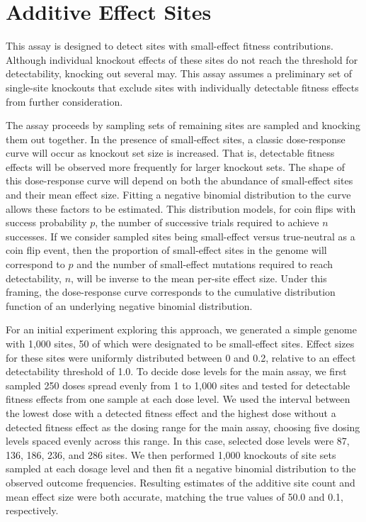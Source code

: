 \section{Additive Effect Sites}

This assay is designed to detect sites with small-effect fitness contributions.
Although individual knockout effects of these sites do not reach the threshold for detectability, knocking out several may.
This assay assumes a preliminary set of single-site knockouts that exclude sites with individually detectable fitness effects from further consideration.

The assay proceeds by sampling sets of remaining sites are sampled and knocking them out together.
In the presence of small-effect sites, a classic dose-response curve will occur as knockout set size is increased.
That is, detectable fitness effects will be observed more frequently for larger knockout sets.
The shape of this dose-response curve will depend on both the abundance of small-effect sites and their mean effect size.
Fitting a negative binomial distribution to the curve allows these factors to be estimated.
This distribution models, for coin flips with success probability $p$, the number of successive trials required to achieve $n$ successes.
If we consider sampled sites being small-effect versus true-neutral as a coin flip event, then the proportion of small-effect sites in the genome will correspond to $p$ and the number of small-effect mutations required to reach detectability, $n$, will be inverse to the mean per-site effect size.
Under this framing, the dose-response curve corresponds to the cumulative distribution function of an underlying negative binomial distribution.

For an initial experiment exploring this approach, we generated a simple genome with 1,000 sites, 50 of which were designated to be small-effect sites.
Effect sizes for these sites were uniformly distributed between 0 and 0.2, relative to an effect detectability threshold of 1.0.
To decide dose levels for the main assay, we first sampled 250 doses spread evenly from 1 to 1,000 sites and tested for detectable fitness effects from one sample at each dose level.
We used the interval between the lowest dose with a detected fitness effect and the highest dose without a detected fitness effect as the dosing range for the main assay, choosing five dosing levels spaced evenly across this range.
In this case, selected dose levels were 87, 136, 186, 236, and 286 sites.
We then performed 1,000 knockouts of site sets sampled at each dosage level and then fit a negative binomial distribution to the observed outcome frequencies.
Resulting estimates of the additive site count and mean effect size were both accurate, matching the true values of 50.0 and 0.1, respectively.


